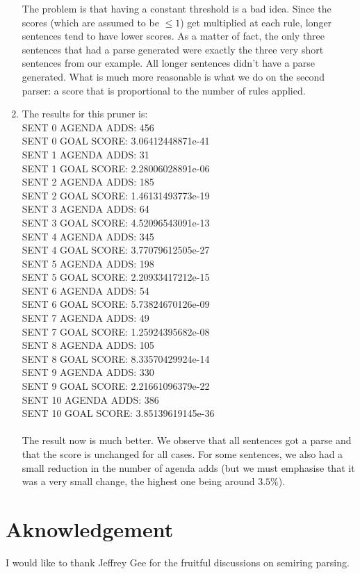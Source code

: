 \documentclass{article}
\begin{document}
\begin{spacing}{1.1}
\begin{enumerate}
The problem is that having a constant threshold is a bad idea. Since the scores (which are assumed to be $\le 1$) get multiplied at each rule, longer sentences tend to have lower scores. As a matter of fact, the only three sentences that had a parse generated were exactly the three very short sentences from our example. All longer sentences didn't have a parse generated. What is much more reasonable is what we do on the second parser: a score that is proportional to the number of rules applied.

\item
The results for this pruner is: \\
SENT 0 AGENDA ADDS: 456\\
SENT 0 GOAL SCORE: 3.06412448871e-41\\
SENT 1 AGENDA ADDS: 31\\
SENT 1 GOAL SCORE: 2.28006028891e-06\\
SENT 2 AGENDA ADDS: 185\\
SENT 2 GOAL SCORE: 1.46131493773e-19\\
SENT 3 AGENDA ADDS: 64\\
SENT 3 GOAL SCORE: 4.52096543091e-13\\
SENT 4 AGENDA ADDS: 345\\
SENT 4 GOAL SCORE: 3.77079612505e-27\\
SENT 5 AGENDA ADDS: 198\\
SENT 5 GOAL SCORE: 2.20933417212e-15\\
SENT 6 AGENDA ADDS: 54\\
SENT 6 GOAL SCORE: 5.73824670126e-09\\
SENT 7 AGENDA ADDS: 49\\
SENT 7 GOAL SCORE: 1.25924395682e-08\\
SENT 8 AGENDA ADDS: 105\\
SENT 8 GOAL SCORE: 8.33570429924e-14\\
SENT 9 AGENDA ADDS: 330\\
SENT 9 GOAL SCORE: 2.21661096379e-22\\
SENT 10 AGENDA ADDS: 386\\
SENT 10 GOAL SCORE: 3.85139619145e-36\\
\\
The result now is much better. We observe that all sentences got a parse and that the score is unchanged for all cases. For some sentences, we also had a small reduction in the number of agenda adds (but we must emphasise that it was a very small change, the highest one being around $3.5\%$).


\end{enumerate}


\section{Aknowledgement}
I would like to thank Jeffrey Gee for the fruitful discussions on semiring parsing. 


\end{spacing}
\end{document}

